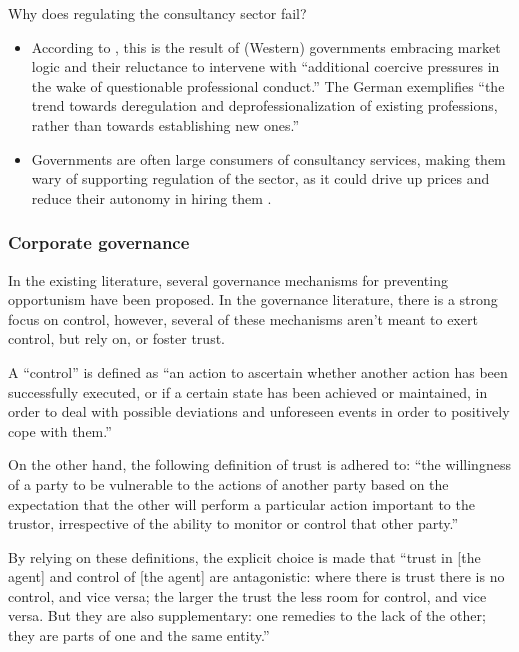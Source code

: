 \documentclass[12pt]{article}
\begin{document}
Why does regulating the consultancy sector fail?

\begin{itemize}
\item
  According to \citet{leicht2006}, this is the result of (Western)
  governments embracing market logic and their reluctance to intervene
  with ``additional coercive pressures in the wake of questionable
  professional conduct.'' The German exemplifies ``the trend towards
  deregulation and deprofessionalization of existing professions, rather
  than towards establishing new ones.'' \citep[ 90]{kieser2006}
\item
  Governments are often large consumers of consultancy services, making
  them wary of supporting regulation of the sector, as it could drive up
  prices and reduce their autonomy in hiring them \citep[
  815]{muzio2011}.
\end{itemize}

\subsubsection{Corporate governance}\label{corporate-governance}

In the existing literature, several governance mechanisms for preventing
opportunism have been proposed. In the governance literature, there is a
strong focus on control, however, several of these mechanisms aren't
meant to exert control, but rely on, or foster trust.

A ``control'' is defined as ``an action to ascertain whether another
action has been successfully executed, or if a certain state has been
achieved or maintained, in order to deal with possible deviations and
unforeseen events in order to positively cope with them.'' \citep[
809]{castelfranchi2000}

On the other hand, the following definition of trust is adhered to:
``the willingness of a party to be vulnerable to the actions of another
party based on the expectation that the other will perform a particular
action important to the trustor, irrespective of the ability to monitor
or control that other party.'' \citep{kee1970}

By relying on these definitions, the explicit choice is made that
``trust in {[}the agent{]} and control of {[}the agent{]} are
antagonistic: where there is trust there is no control, and vice versa;
the larger the trust the less room for control, and vice versa. But they
are also supplementary: one remedies to the lack of the other; they are
parts of one and the same entity.'' \citep[ 813]{castelfranchi2000}
\end{document}
